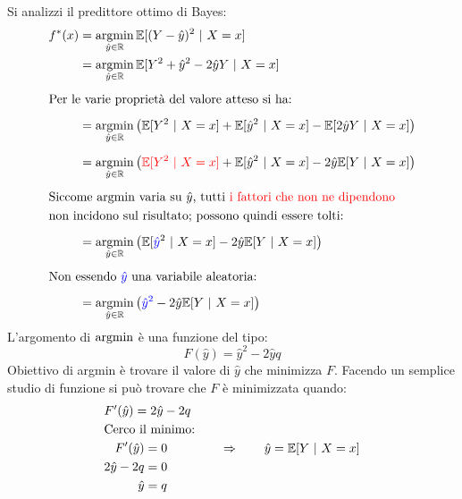 Si analizzi il predittore ottimo di Bayes:
\begin{align}
    f^*(x) &= \argmin_{\hat{y}\in\RN} \E[(Y-\hat{y})^2 \ | \ X=x]  \notag\\
           &= \argmin_{\hat{y}\in\RN} \E[Y^2+\hat{y}^2-2\hat{y}Y\ | \ X=x]\notag\\[.6em]
        \multispan2{Per le varie proprietà del valore atteso si ha:\hfil} \notag\\[.6em]
           &= \argmin_{\hat{y}\in\RN}
            \left({\E[Y^2\ | \ X=x]}+\E[\hat{y}^2\ | \ X=x]-\E[2\hat{y}Y\ | \ X=x]\right)
            \notag\\[.6em]
           &= \argmin_{\hat{y}\in\RN}
           \left({\color{red}\E[Y^2\ | \ X=x]}+\E[\hat{y}^2\ | \ X=x]-2\hat{y}\E[Y\ | \ X=x]\right)
           \notag\\[.6em]
        \multispan2{Siccome $\argmin$ varia su $\hat{y}$, tutti {\color{red}i fattori che non ne dipendono}\hfil
        } \notag\\
        \multispan2{non incidono sul risultato; possono quindi essere tolti:\hfil
        } \notag\\[.6em]
        &= \argmin_{\hat{y}\in\RN}
           \left(\E[{\color{blue}\hat{y}}^2\ | \ X=x]-2\hat{y}\E[Y\ | \ X=x]\right)
           \notag\\[.6em]
        \multispan2{Non essendo ${\color{blue}\hat{y}}$ una variabile aleatoria:\hfil
           } \notag\\[.6em]
        &= \argmin_{\hat{y}\in\RN}
            \left({\color{blue}\hat{y}^2}-2\hat{y}\E[Y\ | \ X=x]\right) \notag
\end{align}
L'argomento di $\operatorname*{argmin}$ è una funzione del tipo:
\begin{equation}
    F(\hat{y}) = \hat{y}^2 -2\hat{y}q \tag*{$q=\E[Y\ | \ X=x]$}
\end{equation}
Obiettivo di argmin è trovare il valore di $\hat{y}$ che minimizza $F$. Facendo 
un semplice studio di funzione si può trovare che $F$ è minimizzata quando:
$$
\begin{aligned}
    \multispan2{$F'(\hat{y}) = 2\hat{y}-2q$} \\
    \multispan2{Cerco il minimo:\hfill}\\
    F'(\hat{y}) &= 0\\
    2\hat{y}-2q &= 0\\
    \hat{y}     &=q\\
\end{aligned} \qquad \Rightarrow \qquad \hat{y}=\E[Y\ | \ X=x]
$$

